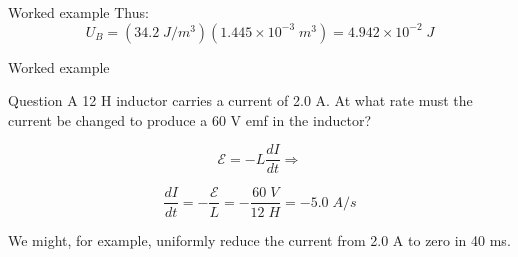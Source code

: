{\begin{frame}{Worked example}
Thus:
\begin{equation*}
  U_B = (34.2 \; J/m^3) (1.445 \times 10^{-3} \; m^3) = 4.942 \times 10^{-2} \; J
\end{equation*}

\end{frame}

} %


%
%

{
\problemslide

\begin{frame}{Worked example}

\begin{blockexmplque}{Question}
  A 12 H inductor carries a current of 2.0 A. At what rate must the
  current be changed to produce a 60 V emf in the inductor?
\end{blockexmplque}

\begin{equation*}
  \mathcal{E} = -L \frac{dI}{dt} \Rightarrow
\end{equation*}

\begin{equation*}
  \frac{dI}{dt} = -\frac{\mathcal{E}}{L} = -\frac{60\; V}{12 \; H} = -5.0 \; A/s
\end{equation*}

We might, for example, uniformly reduce the current from 2.0 A to
zero in 40 ms.

\end{frame}

} %


%
%

